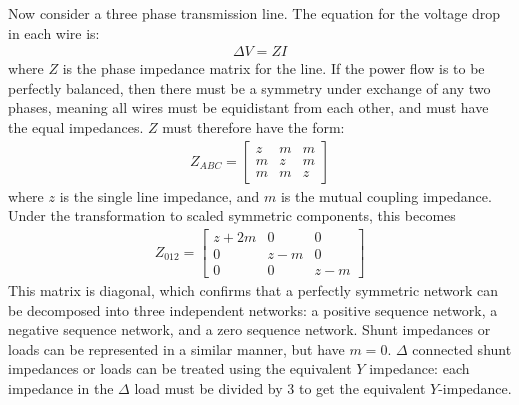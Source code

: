 \documentclass[11pt]{article}
\begin{document}
Now consider a three phase transmission line. The equation for the voltage drop in each wire is:
\begin{align}
	\Delta V = ZI
\end{align}
where $Z$ is the phase impedance matrix for the line. If the power flow is to be perfectly balanced, then there must be a symmetry under exchange of any two phases, meaning all wires must be equidistant from each other, and must have the equal impedances. $Z$ must therefore have the form:
\begin{align}
	Z_{ABC} = \left[
			\begin{array}{lll}
				z & m & m \\
				m & z & m \\
				m & m & z
			\end{array}
		\right]
		\label{EQ_ZABC}
\end{align}
where $z$ is the single line impedance, and $m$ is the mutual coupling impedance. Under the transformation to scaled symmetric components, this becomes
\begin{align}
	Z_{012} = \left[
			\begin{array}{lll}
				z+2m & 0 & 0 \\
				0 & z-m & 0 \\
				0 & 0 & z-m
			\end{array}
		\right]
		\label{EQ_Z012}
\end{align}
This matrix is diagonal, which confirms that a perfectly symmetric network can be decomposed into three independent networks: a positive sequence network, a negative sequence network, and a zero sequence network. Shunt impedances or loads can be represented in a similar manner, but have $m = 0$. $\Delta$ connected shunt impedances or loads can be treated using the equivalent $Y$ impedance: each impedance in the $\Delta$ load must be divided by 3 to get the equivalent $Y$-impedance.
\end{document}
